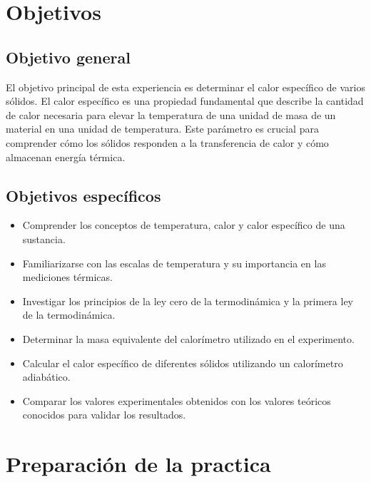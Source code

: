 \documentclass[twocolumn, 12pt]{article}
\begin{document}
\section{Objetivos}

\subsection{Objetivo general}

El objetivo principal de esta experiencia es determinar el
calor específico de varios sólidos. El calor específico es
una propiedad fundamental que describe la cantidad de calor
necesaria para elevar la temperatura de una unidad de masa
de un material en una unidad de temperatura. Este parámetro
es crucial para comprender cómo los sólidos responden a la
transferencia de calor y cómo almacenan energía térmica.

\subsection{Objetivos específicos}

\begin{itemize}[label=$\triangleright$]
    \item Comprender los conceptos de temperatura, calor y calor
          específico de una sustancia.

    \item Familiarizarse con las escalas de temperatura y su
          importancia en las mediciones térmicas.

    \item Investigar los principios de la ley cero de la
          termodinámica y la primera ley de la termodinámica.

    \item Determinar la masa equivalente del calorímetro utilizado en
          el experimento.

    \item Calcular el calor específico de diferentes sólidos
          utilizando un calorímetro adiabático.

    \item Comparar los valores experimentales obtenidos con los
          valores teóricos conocidos para validar los resultados.
\end{itemize}

\section{Preparación de la practica}
\end{document}

